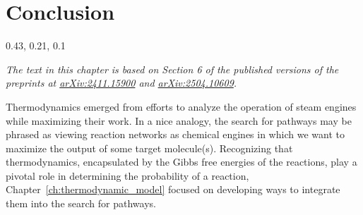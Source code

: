 \chapter{Conclusion}
\label{ch:conclusion} %

\definecolor{myBrown}{rgb} {0.43, 0.21, 0.1}

{\sffamily\slshape The text in this chapter is based on Section 6 of the published versions of the preprints at \href{https://arxiv.org/abs/2411.15900}{arXiv:2411.15900} and \href{https://arxiv.org/abs/2504.10609}{arXiv:2504.10609}.\\}

Thermodynamics emerged from efforts to analyze the operation of steam engines while maximizing their work.
In a nice analogy, the search for pathways may be phrased as viewing reaction networks as chemical engines in which we want to maximize the output of some target molecule(s).
Recognizing that thermodynamics, encapsulated by the Gibbs free energies of the reactions, play a pivotal role in determining the probability of a reaction, Chapter~\ref{ch:thermodynamic_model} focused on developing ways to integrate them into the search for pathways.

